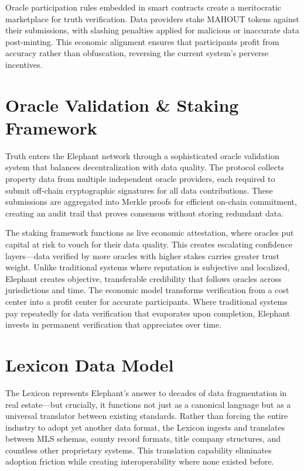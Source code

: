 Oracle participation rules embedded in smart contracts create a meritocratic marketplace for truth verification. Data providers stake MAHOUT tokens against their submissions, with slashing penalties applied for malicious or inaccurate data post-minting. This economic alignment ensures that participants profit from accuracy rather than obfuscation, reversing the current system's perverse incentives.

\section{Oracle Validation \& Staking Framework}

Truth enters the Elephant network through a sophisticated oracle validation system that balances decentralization with data quality. The protocol collects property data from multiple independent oracle providers, each required to submit off-chain cryptographic signatures for all data contributions. These submissions are aggregated into Merkle proofs for efficient on-chain commitment, creating an audit trail that proves consensus without storing redundant data.

The staking framework functions as live economic attestation, where oracles put capital at risk to vouch for their data quality. This creates escalating confidence layers—data verified by more oracles with higher stakes carries greater trust weight. Unlike traditional systems where reputation is subjective and localized, Elephant creates objective, transferable credibility that follows oracles across jurisdictions and time. The economic model transforms verification from a cost center into a profit center for accurate participants. Where traditional systems pay repeatedly for data verification that evaporates upon completion, Elephant invests in permanent verification that appreciates over time.

\section{Lexicon Data Model}

The Lexicon represents Elephant's answer to decades of data fragmentation in real estate—but crucially, it functions not just as a canonical language but as a universal translator between existing standards. Rather than forcing the entire industry to adopt yet another data format, the Lexicon ingests and translates between MLS schemas, county record formats, title company structures, and countless other proprietary systems. This translation capability eliminates adoption friction while creating interoperability where none existed before.


